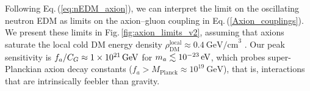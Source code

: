 Following Eq.\,(\ref{eq:nEDM_axion}), we can interpret the limit on the oscillating neutron EDM as limits on the axion--gluon coupling in Eq.\,(\ref{Axion_couplings}).
We present these limits in Fig.\,\ref{fig:axion_limits_v2}, assuming that axions saturate the local cold DM energy density $\rho_{\mathrm{DM}}^{\mathrm{local}} \approx 0.4~\textrm{GeV/cm}^3$ \cite{Catena2010}.
Our peak sensitivity is
$f_a/C_G \approx \unit[1 \times 10^{21}]{GeV}$ for $m_a \lesssim \unit[10^{-23}]{eV}$, which probes super-Planckian axion decay constants ($f_a > M_{\textrm{Planck}} \approx 10^{19}~\textrm{GeV}$), that is, interactions that are intrinsically feebler than gravity.

